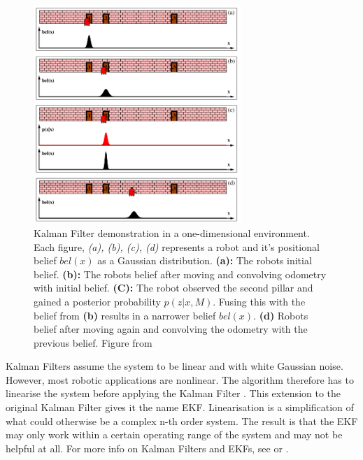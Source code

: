 \begin{figure}[htp]
  \centering
  \includegraphics[width = 0.7\textwidth]{Figures/figKalmanFilter.pdf}
  \caption{Kalman Filter demonstration in a one-dimensional environment. Each figure, \textit{(a), (b), (c), (d)} represents a robot and it's positional belief $bel(x)$ as a Gaussian distribution. \textbf{(a):} The robots initial belief. \textbf{(b):} The robots belief after moving and convolving odometry with initial belief. \textbf{(C):} The robot observed the second pillar and gained a posterior probability $p(z|x,M)$. Fusing this with the belief from \textbf{(b)} results in a narrower belief $bel(x)$. \textbf{(d)} Robots belief after moving again and convolving the odometry with the previous belief. Figure from \cite{ThrunSebastian2005Pr}}
  \label{fig:kalmanFilter}
\end{figure}

Kalman Filters assume the system to be linear and with white Gaussian noise. However, most robotic applications are nonlinear. The algorithm therefore has to linearise the system before applying the Kalman Filter \cite{SiegwartRoland2011Itam}. This extension to the original Kalman Filter gives it the name EKF. Linearisation is a simplification of what could otherwise be a complex n-th order system. The result is that the EKF may only work within a certain operating range of the system and may not be helpful at all. For more info on Kalman Filters and EKFs, see \cite{SiegwartRoland2011Itam} or \cite{ThrunSebastian2005Pr}.

